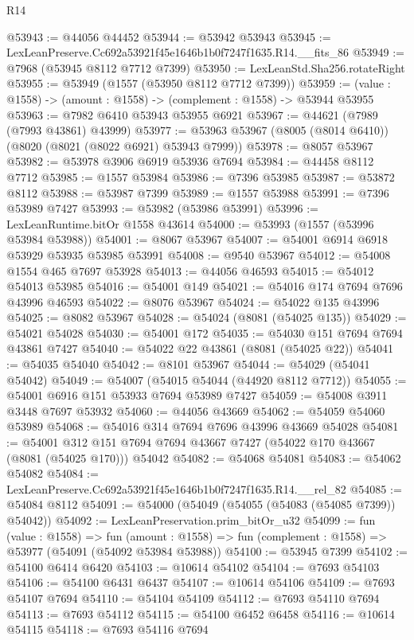\begin{lexlean}{R14}
\begin{coremodule}
@53943 := @44056 @44452
@53944 := @53942 @53943
@53945 := LexLeanPreserve.Cc692a53921f45e1646b1b0f7247f1635.R14.__fits_86
@53949 := @7968 (@53945 @8112 @7712 @7399)
@53950 := LexLeanStd.Sha256.rotateRight
@53955 := @53949 (@1557 (@53950 @8112 @7712 @7399))
@53959 := (value : @1558) -> (amount : @1558) -> (complement : @1558) -> @53944 @53955
@53963 := @7982 @6410 @53943 @53955 @6921
@53967 := @44621 (@7989 (@7993 @43861) @43999)
@53977 := @53963 @53967 (@8005 (@8014 @6410)) (@8020 (@8021 (@8022 @6921) @53943 @7999))
@53978 := @8057 @53967
@53982 := @53978 @3906 @6919 @53936 @7694
@53984 := @44458 @8112 @7712
@53985 := @1557 @53984
@53986 := @7396 @53985
@53987 := @53872 @8112
@53988 := @53987 @7399
@53989 := @1557 @53988
@53991 := @7396 @53989 @7427
@53993 := @53982 (@53986 @53991)
@53996 := LexLeanRuntime.bitOr @1558 @43614
@54000 := @53993 (@1557 (@53996 @53984 @53988))
@54001 := @8067 @53967
@54007 := @54001 @6914 @6918 @53929 @53935 @53985 @53991
@54008 := @9540 @53967
@54012 := @54008 @1554 @465 @7697 @53928
@54013 := @44056 @46593
@54015 := @54012 @54013 @53985
@54016 := @54001 @149
@54021 := @54016 @174 @7694 @7696 @43996 @46593
@54022 := @8076 @53967
@54024 := @54022 @135 @43996
@54025 := @8082 @53967
@54028 := @54024 (@8081 (@54025 @135))
@54029 := @54021 @54028
@54030 := @54001 @172
@54035 := @54030 @151 @7694 @7694 @43861 @7427
@54040 := @54022 @22 @43861 (@8081 (@54025 @22))
@54041 := @54035 @54040
@54042 := @8101 @53967
@54044 := @54029 (@54041 @54042)
@54049 := @54007 (@54015 @54044 (@44920 @8112 @7712))
@54055 := @54001 @6916 @151 @53933 @7694 @53989 @7427
@54059 := @54008 @3911 @3448 @7697 @53932
@54060 := @44056 @43669
@54062 := @54059 @54060 @53989
@54068 := @54016 @314 @7694 @7696 @43996 @43669 @54028
@54081 := @54001
    @312
    @151
    @7694
    @7694
    @43667
    @7427
    (@54022 @170 @43667 (@8081 (@54025 @170)))
    @54042
@54082 := @54068 @54081
@54083 := @54062 @54082
@54084 := LexLeanPreserve.Cc692a53921f45e1646b1b0f7247f1635.R14.__rel_82
@54085 := @54084 @8112
@54091 := @54000 (@54049 (@54055 (@54083 (@54085 @7399)) @54042))
@54092 := LexLeanPreservation.prim_bitOr_u32
@54099 := fun (value : @1558) =>
  fun (amount : @1558) => fun (complement : @1558) => @53977 (@54091 (@54092 @53984 @53988))
@54100 := @53945 @7399
@54102 := @54100 @6414 @6420
@54103 := @10614 @54102
@54104 := @7693 @54103
@54106 := @54100 @6431 @6437
@54107 := @10614 @54106
@54109 := @7693 @54107 @7694
@54110 := @54104 @54109
@54112 := @7693 @54110 @7694
@54113 := @7693 @54112
@54115 := @54100 @6452 @6458
@54116 := @10614 @54115
@54118 := @7693 @54116 @7694

\end{coremodule}
\end{lexlean}
